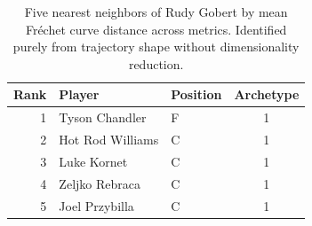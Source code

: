 \begin{table}[htbp]
  \centering\small
  \begin{tabular}{rllc}
    \toprule
    Rank & Player & Position & Archetype \\
    \midrule
    1 & Tyson Chandler & F & 1 \\
    2 & Hot Rod Williams & C & 1 \\
    3 & Luke Kornet & C & 1 \\
    4 & Zeljko Rebraca & C & 1 \\
    5 & Joel Przybilla & C & 1 \\
    \bottomrule
  \end{tabular}
  \caption{Five nearest neighbors of Rudy Gobert by mean Fr\'{e}chet curve distance across metrics. Identified purely from trajectory shape without dimensionality reduction.}
  \label{tab:Rudy_Gobert_frechet_curve_neighbors}
\end{table}

